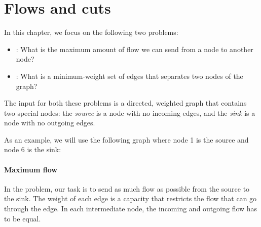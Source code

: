 \chapter{Flows and cuts}

In this chapter, we focus on the following
two problems:

\begin{itemize}
\item {}:
What is the maximum amount of flow we can
send from a node to another node?
\item {}:
What is a minimum-weight set of edges
that separates two nodes of the graph?
\end{itemize}

The input for both these problems is a directed,
weighted graph that contains two special nodes:
the \emph{source} is a node with no incoming edges,
and the \emph{sink} is a node with no outgoing edges.

As an example, we will use the following graph
where node 1 is the source and node 6
is the sink:

\begin{center}
\end{center}

\subsubsection{Maximum flow}


In the  problem,
our task is to send as much flow as possible
from the source to the sink.
The weight of each edge is a capacity that
restricts the flow
that can go through the edge.
In each intermediate node,
the incoming and outgoing
flow has to be equal.

